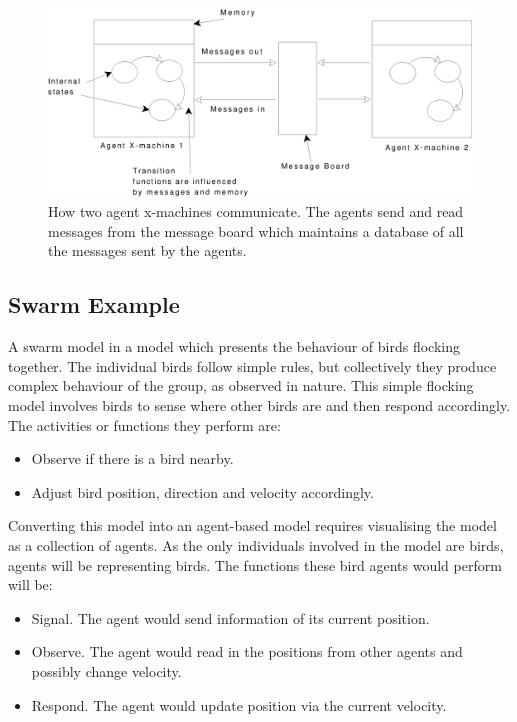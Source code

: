 \begin{figure}[!htb]
\begin{center}
  \includegraphics*[scale=0.45]{commxm.eps}
  \caption{How two agent x-machines communicate. The agents send and read messages from the message board which maintains a database of all the messages sent by the agents.}
  \label{fig:commxm}
  \end{center}
\end{figure}



\subsection{Swarm Example}

A swarm model in a model which presents the behaviour of birds flocking together. The individual birds follow simple rules, but collectively they produce complex behaviour of the group, as observed in nature.
This simple flocking
model involves birds to sense where other birds are and then respond accordingly. The activities or functions they perform are:

\begin{itemize}
\item Observe if there is a bird nearby.
\item Adjust bird position, direction and velocity accordingly.
\end{itemize}


Converting this model into an agent-based model requires visualising the model as a collection of agents. As the only individuals involved in the model are birds, agents will be representing birds. The functions these bird agents would perform will be:

\begin{itemize}
\item Signal. The agent would send information of its current
position.
\item Observe. The agent would read in the positions from other agents and possibly change
velocity.
\item Respond. The agent would update position via the current
velocity.
\end{itemize}

